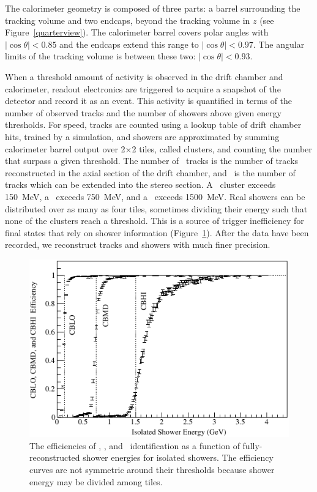 \documentclass{cornell}
\begin{document}
The calorimeter geometry is composed of three parts: a barrel
surrounding the tracking volume and two endcaps, beyond the tracking
volume in $z$ (see Figure~\ref{quarterview}).  The calorimeter barrel
covers polar angles with $|\cos\theta| < 0.85$ and the endcaps extend
this range to $|\cos\theta| < 0.97$.  The angular limits of the
tracking volume is between these two: $|\cos\theta| < 0.93$.

When a threshold amount of activity is observed in the drift chamber
and calorimeter, readout electronics are triggered to acquire a
snapshot of the detector and record it as an event.  This activity is
quantified in terms of the number of observed tracks and the number of
showers above given energy thresholds.  For speed, tracks are counted
using a lookup table of drift chamber hits, trained by a simulation,
and showers are approximated by summing calorimeter barrel output over
2$\times$2 tiles, called clusters, and counting the number that
surpass a given threshold.  The number of \axial\ tracks is the number
of tracks reconstructed in the axial section of the drift chamber, and
\stereo\ is the number of tracks which can be extended into the stereo
section.  A \cblo\ cluster exceeds 150~MeV, a \cbmd\ exceeds 750~MeV,
and a \cbhi\ exceeds 1500~MeV.  Real showers can be distributed over
as many as four tiles, sometimes dividing their energy such that none
of the clusters reach a threshold.  This is a source of trigger
inefficiency for final states that rely on shower information
(Figure~\ref{topher}).  After the data have been recorded, we
reconstruct tracks and showers with much finer precision.

\begin{figure}[p]
  \begin{center}
    \includegraphics[width=\linewidth]{plots/topher}
  \end{center}
  \caption{\label{topher} The efficiencies of \cblo, \cbmd, and \cbhi\
  identification as a function of fully-reconstructed shower energies
  for isolated showers.  The efficiency curves are not symmetric
  around their thresholds because shower energy may be divided among
  tiles.}
\end{figure}
\end{document}
